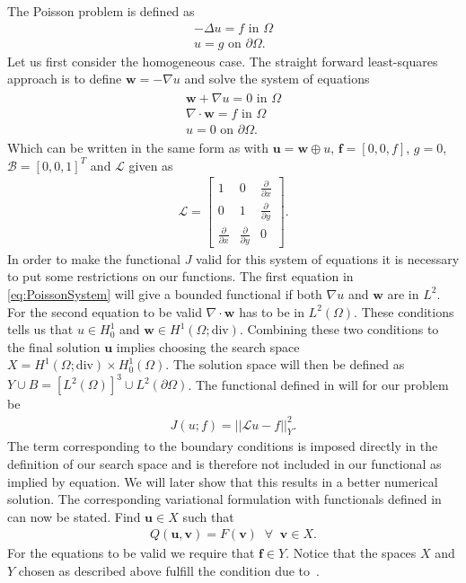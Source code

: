 The Poisson problem is defined as 
\begin{align}
	-\Delta u = f \text{ in } \Omega \\
	u = g \text{ on } \partial \Omega.
	\label{eq:Poisson}
\end{align}
Let us first consider the homogeneous case. The straight forward least-squares approach is to define $\mathbf{w} = -\nabla u$ and solve the system of equations 
\begin{align}
	\begin{split}
	\mathbf{w} + \nabla u = 0 \text{ in } \Omega \\
	\nabla \cdot \mathbf{w} = f \text{ in } \Omega \\
	u = 0 \text{ on } \partial \Omega.
	\end{split}
	\label{eq:PoissonSystem}
\end{align}
Which can be written in the same form as with $ \mathbf{u} = \mathbf{w} \oplus u $, $\mathbf{f} = [0,0,f]$, $g=0$, $\mathcal{B} = [0,0,1]^T $ and $\mathcal{L}$ given as 
\begin{align}
	\mathcal{L} =
	\begin{bmatrix}
		1 & 0 & \frac{\partial} {\partial x}  \\
		0 & 1 & \frac{\partial} {\partial y}  \\
    \frac{\partial} {\partial x} & \frac{\partial} {\partial y} & 0 
	\end{bmatrix}.
	\label{eq:Amatrix}
\end{align}
In order to make the functional $J$ valid for this system of equations it is necessary to put some restrictions on our functions. The first equation in \ref{eq:PoissonSystem} will give a bounded functional if both $\nabla u$ and $\mathbf{w}$ are in $L^2$. For the second equation to be valid $\nabla \cdot \mathbf{w}$ has to be in $L^2(\Omega)$. These conditions tells us that $u \in H_0^1$ and $\mathbf{w} \in H^1(\Omega;\text{div})$. Combining these two conditions to the final solution $\mathbf{u}$ implies choosing the search space $X =  H^1(\Omega;\text{div}) \times H_0^1(\Omega)$. The solution space will then be defined as $Y \cup  B  = [L^2(\Omega)]^3\cup L^2(\partial \Omega) $. The functional defined in will for our problem be 
\begin{align}
	J(u;f) = ||\mathcal{L}u-f||^2_Y.
	\label{eq:lsFunctionalPoisson}
\end{align}
The term corresponding to the boundary conditions is imposed directly in the definition of our search space and is therefore not included in our functional as implied by equation. We will later show that this results in a better numerical solution. The corresponding variational formulation with functionals defined in can now be stated. Find $ \mathbf{u} \in X $ such that
\begin{align}
	Q(\mathbf{u},\mathbf{v}) = F(\mathbf{v}) \;\; \forall \;\; \mathbf{v} \in X.
	\label{eq:VariationalFormulationPoisson}
\end{align}
For the equations to be valid we require that $\mathbf{f} \in Y$.
Notice that the spaces $X$ and $Y$ chosen as described above fulfill the condition due to~\cite{Bochev}. 
%
